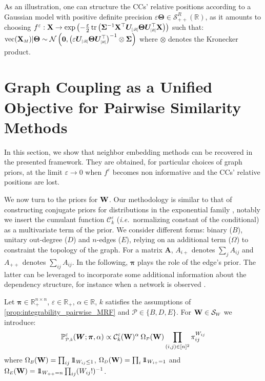 As an illustration, one can structure the CCs' relative positions according to a Gaussian model with positive definite precision $\varepsilon \bm{\Theta} \in \mathcal{S}_{++}^R(\mathbb{R})$, as it amounts to choosing $f^{\varepsilon} : \X \to \exp \left(-\frac{\varepsilon}{2} \operatorname{tr}\left(\bm{\Sigma}^{-1}\X^\top\bm{U}_{\scaleto{[:R]}{5pt}}  \bm{\Theta}\bm{U}^\top_{\scaleto{[R]}{5pt}} \X\right)\right)$ such that: $\mathrm{vec}(\X_{\scaleto{M}{4pt}}) | \bm{\Theta} \sim \mathcal{N}\left(\bm{0}, \left(\varepsilon \bm{U}_{\scaleto{[:R]}{5pt}}  \bm{\Theta}\bm{U}^\top_{\scaleto{[R]}{5pt}}\right)^{-1} \otimes \bm{\Sigma}\right)$ where $\otimes$ denotes the Kronecker product.

\section{Graph Coupling as a Unified Objective for Pairwise Similarity Methods}\label{sec:GC_unified}

In this section, we show that neighbor embedding methods can be recovered in the presented framework. They are obtained, for particular choices of graph priors, at the limit $\varepsilon \to 0$ when $f^{\varepsilon}$ becomes non informative and the CCs' relative positions are lost. 

We now turn to the priors for $\mathbf{W}$. Our methodology is similar to that of constructing conjugate priors for distributions in the exponential family \cite{wainwright2008graphical}, notably we insert the cumulant function $\mathcal{C}_k^{\varepsilon}$ (\textit{i.e.}\ normalizing constant of the conditional) as a multivariate term of the prior. 
We consider different forms: binary ($B$), unitary out-degree ($D$) and $n$-edges ($E$), relying on an additional term ($\Omega$) to constraint the topology of the graph. For a matrix $\bm{A}$, $A_{i+}$ denotes $\sum_j A_{ij}$ and $A_{++}$ denotes $\sum_{ij} A_{ij}$. In the following, $\bm{\pi}$ plays the role of the edge's prior. The latter can be leveraged to incorporate some additional information about the dependency structure, for instance when a network is observed \cite{li2020high}. 

\begin{definition}\label{def:prior_W}
Let $\bm{\pi} \in \mathbb{R}_+^{n \times n}$, $\varepsilon \in \mathbb{R}_+$, $\alpha \in \mathbb{R}$, $k$ satisfies the assumptions of \cref{prop:integrability_pairwise_MRF} and $\mathcal{P} \in \{B,D,E\}$. For $\W \in \mathcal{S}_{\scaleto{W}{4pt}}$ we introduce:
$$\mathbb{P}_{\scaleto{\mathcal{P},k}{5pt}}^{\varepsilon}(\bm{W}; \bm{\pi}, \alpha) \propto \mathcal{C}^{\varepsilon}_k(\W)^{\alpha} \: \Omega_{\scaleto{\mathcal{P}}{4pt}}(\W) \prod_{(i,j) \in [n]^2} \pi_{ij}^{W_{ij}}$$
where $\Omega_{\scaleto{B}{4pt}}(\W) = \prod_{ij} \ind_{W_{ij} \leq 1}$, $\Omega_{\scaleto{D}{4pt}}(\W) = \prod_{i} \ind_{W_{i+} = 1}$ and $\Omega_{\scaleto{E}{4pt}}(\W) = \ind_{W_{++} = n}\prod_{ij}(W_{ij}!)^{-1}$.
\end{definition}

